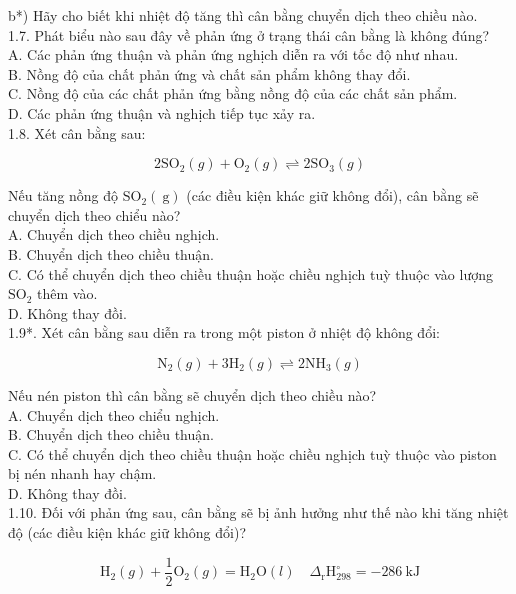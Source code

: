 \documentclass[10pt]{article}
\begin{document}
b*) Hãy cho biết khi nhiệt độ tăng thì cân bằng chuyển dịch theo chiều nào.\\
1.7. Phát biểu nào sau đây về phản ứng ở trạng thái cân bằng là không đúng?\\
A. Các phản ứng thuận và phản ứng nghịch diễn ra với tốc độ như nhau.\\
B. Nồng độ của chất phản ứng và chất sản phẩm không thay đổi.\\
C. Nồng độ của các chất phản ứng bằng nồng độ của các chất sản phẩm.\\
D. Các phản ứng thuận và nghịch tiếp tục xảy ra.\\
1.8. Xét cân bằng sau:

$$
2 \mathrm{SO}_{2}(g)+\mathrm{O}_{2}(g) \rightleftharpoons 2 \mathrm{SO}_{3}(g)
$$

Nếu tăng nồng độ $\mathrm{SO}_{2}(\mathrm{~g})$ (các điều kiện khác giữ không đổi), cân bằng sẽ chuyển dịch theo chiểu nào?\\
A. Chuyển dịch theo chiều nghịch.\\
B. Chuyển dịch theo chiều thuận.\\
C. Có thể chuyển dịch theo chiều thuận hoặc chiều nghịch tuỳ thuộc vào lượng $\mathrm{SO}_{2}$ thêm vào.\\
D. Không thay đồi.\\
1.9*. Xét cân bằng sau diễn ra trong một piston ở nhiệt độ không đổi:

$$
\mathrm{N}_{2}(g)+3 \mathrm{H}_{2}(g) \rightleftharpoons 2 \mathrm{NH}_{3}(g)
$$

Nếu nén piston thì cân bằng sẽ chuyển dịch theo chiều nào?\\
A. Chuyển dịch theo chiểu nghịch.\\
B. Chuyển dịch theo chiều thuận.\\
C. Có thể chuyển dịch theo chiều thuận hoặc chiều nghịch tuỳ thuộc vào piston bị nén nhanh hay chậm.\\
D. Không thay đồi.\\
1.10. Đối với phản ứng sau, cân bằng sẽ bị ảnh hưởng như thế nào khi tăng nhiệt độ (các điều kiện khác giữ không đổi)?

$$
\mathrm{H}_{2}(g)+\frac{1}{2} \mathrm{O}_{2}(g)=\mathrm{H}_{2} \mathrm{O}(l) \quad \Delta_{\mathrm{r}} \mathrm{H}_{298}^{\circ}=-286 \mathrm{~kJ}
$$
\end{document}

